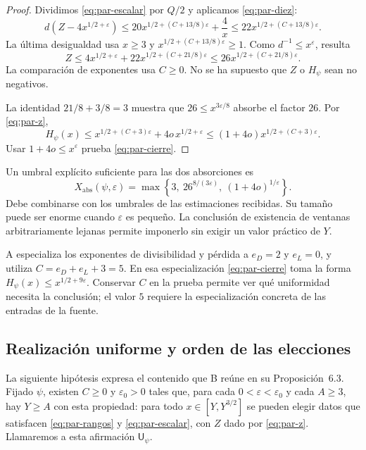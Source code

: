 \begin{proof}
Dividimos \eqref{eq:par-escalar} por $Q/2$ y aplicamos
\eqref{eq:par-diez}:
\[
 d\left(Z-4x^{1/2+\varepsilon}\right)
 \le20x^{1/2+(C+13/8)\varepsilon}+\frac4x
 \le22x^{1/2+(C+13/8)\varepsilon}.
\]
La última desigualdad usa $x\ge3$ y
$x^{1/2+(C+13/8)\varepsilon}\ge1$.
Como $d^{-1}\le x^\varepsilon$, resulta
\[
 Z\le4x^{1/2+\varepsilon}
       +22x^{1/2+(C+21/8)\varepsilon}
 \le26x^{1/2+(C+21/8)\varepsilon}.
\]
La comparación de exponentes usa $C\ge0$. No se ha supuesto que
$Z$ o $H_\psi$ sean no negativos.

La identidad $21/8+3/8=3$ muestra que
$26\le x^{3\varepsilon/8}$ absorbe el factor $26$.
Por \eqref{eq:par-z},
\[
 H_\psi(x)\le x^{1/2+(C+3)\varepsilon}
                  +4o\,x^{1/2+\varepsilon}
 \le (1+4o)x^{1/2+(C+3)\varepsilon}.
\]
Usar $1+4o\le x^\varepsilon$ prueba \eqref{eq:par-cierre}.
\end{proof}

Un umbral explícito suficiente para las dos absorciones es
\begin{equation}
 X_{\mathrm{abs}}(\psi,\varepsilon)=
 \max\left\{3,\ 26^{8/(3\varepsilon)},\
                      (1+4o)^{1/\varepsilon}\right\}.
 \label{eq:par-umbral}
\end{equation}
Debe combinarse con los umbrales de las estimaciones recibidas.
Su tamaño puede ser enorme cuando $\varepsilon$ es pequeño.
La conclusión de existencia de ventanas arbitrariamente lejanas
permite imponerlo sin exigir un valor práctico de $Y$.

A especializa los exponentes de divisibilidad y pérdida a
$e_D=2$ y $e_L=0$, y utiliza $C=e_D+e_L+3=5$.
En esa especialización \eqref{eq:par-cierre} toma la forma
$H_\psi(x)\le x^{1/2+9\varepsilon}$.
Conservar $C$ en la prueba permite ver qué uniformidad necesita
la conclusión; el valor $5$ requiere la especialización concreta
de las entradas de la fuente.

\subsection{Realización uniforme y orden de las elecciones}

La siguiente hipótesis expresa el contenido que B reúne en su
Proposición~6.3. Fijado $\psi$, existen $C\ge0$ y
$\varepsilon_0>0$ tales que, para cada
$0<\varepsilon<\varepsilon_0$ y cada $A\ge3$, hay $Y\ge A$
con esta propiedad: para todo $x\in[Y,Y^{3/2}]$ se pueden elegir
datos que satisfacen \eqref{eq:par-rangos} y
\eqref{eq:par-escalar}, con $Z$ dado por \eqref{eq:par-z}.
Llamaremos a esta afirmación $\mathsf U_\psi$.

